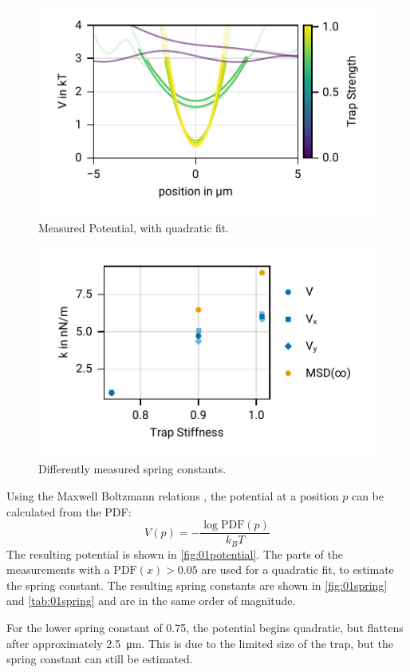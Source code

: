 \documentclass[
    twoside=false,
    twocolumn=true,
    fontsize=11pt,
]{scrarticle}
\begin{document}
\begin{figure}
    \centering
    \includegraphics{figures/01_03_3_axis.pdf}
    \caption{Measured Potential, with quadratic fit.}
    \label{fig:01potential}
\end{figure}
\begin{figure}
    \centering
    \includegraphics{figures/01_03_4_spring_constants.pdf}
    \caption{Differently measured spring constants.}
    \label{fig:01spring}
\end{figure}
Using the Maxwell Boltzmann relations \cite{instructions}, the potential at a position $p$ can be calculated from the PDF:
\begin{equation}
    V(p) = - \frac{\log{\text{PDF}(p)}}{k_B T}
\end{equation}
The resulting potential is shown in \autoref{fig:01potential}.
The parts of the measurements with a $\text{PDF}(x)>0.05$ are used for a quadratic fit, to estimate the spring constant.
The resulting spring constants are shown in \autoref{fig:01spring} and \autoref{tab:01spring} and are in the same order of magnitude. 

For the lower spring constant of \SI{0.75}{}, the potential begins quadratic, but flattens after approximately \SI{2.5}{\micro m}. 
This is due to the limited size of the trap, but the spring constant can still be estimated.
\end{document}
